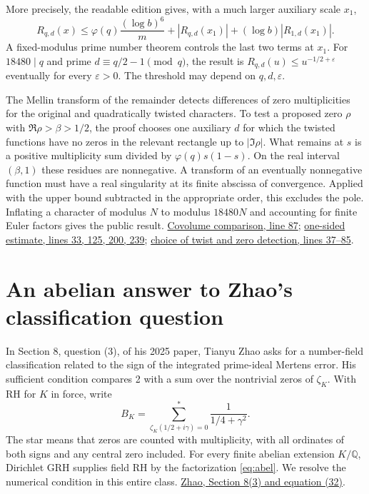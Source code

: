 \documentclass[11pt]{article}
\newcommand{\Q}{\mathbb Q}\newcommand{\R}{\mathbb R}
\newcommand{\repo}{https://github.com/lsernau/grh-lean/blob/72fead102f663d5c7a407964a13dc0cf9d977207}
\newcommand{\src}[2]{\href{\repo/grh/src/#1.lean}{#2}}
\begin{document}
More precisely, the readable edition gives, with a much larger auxiliary scale $x_1$,
\[
 R_{q,d}(x)\le \varphi(q)\frac{(\log b)^6}{m}
                  +|R_{q,d}(x_1)|+(\log b)|R_{1,d}(x_1)|.
\]
A fixed-modulus prime number theorem controls the last two terms at $x_1$. For $18480\mid q$ and prime $d\equiv q/2-1\pmod q$, the result is
$R_{q,d}(u)\le u^{-1/2+\varepsilon}$ eventually for every $\varepsilon>0$. The threshold may depend on $q,d,\varepsilon$.

The Mellin transform of the remainder detects differences of zero multiplicities for the original and quadratically twisted characters. To test a proposed zero $\rho$ with $\Re\rho>\beta>1/2$, the proof chooses one auxiliary $d$ for which the twisted functions have no zeros in the relevant rectangle up to $|\Im\rho|$. What remains at $s$ is a positive multiplicity sum divided by $\varphi(q)s(1-s)$. On the real interval $(\beta,1)$ these residues are nonnegative. A transform of an eventually nonnegative function must have a real singularity at its finite abscissa of convergence. Applied with the upper bound subtracted in the appropriate order, this excludes the pole. Inflating a character of modulus $N$ to modulus $18480N$ and accounting for finite Euler factors gives the public result. \src{New/Reduction/MainInequality}{Covolume comparison, line 87}; \src{New/Reduction/OneSidedBound}{one-sided estimate, lines 33, 125, 200, 239}; \src{New/Reduction/Zeros/Criterion}{choice of twist and zero detection, lines 37--85}.


\section{An abelian answer to Zhao's classification question}
In Section 8, question (3), of his 2025 paper, Tianyu Zhao asks for a number-field classification related to the sign of the integrated prime-ideal Mertens error. His sufficient condition compares 2 with a sum over the nontrivial zeros of $\zeta_K$. With RH for $K$ in force, write
\[
     B_K=\sum_{\zeta_K(1/2+i\gamma)=0}^{*}
                   \frac{1}{1/4+\gamma^2}.
\]
The star means that zeros are counted with multiplicity, with all ordinates of both signs and any central zero included. For every finite abelian extension $K/\Q$, Dirichlet GRH supplies field RH by the factorization \eqref{eq:abel}. We resolve the numerical condition in this entire class. \href{https://arxiv.org/pdf/2411.18903}{Zhao, Section 8(3) and equation (32)}.
\end{document}
